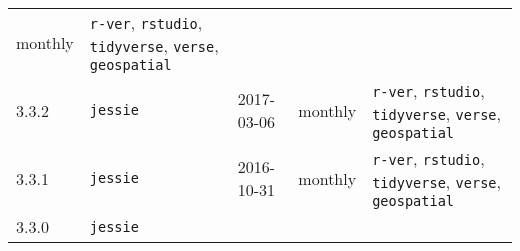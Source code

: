 \begin{longtable}[]{@{}lllll@{}}
\begin{minipage}[t]{0.19\columnwidth}
monthly\strut
\end{minipage} & \begin{minipage}[t]{0.32\columnwidth}\raggedright\strut
\texttt{r-ver}, \texttt{rstudio}, \texttt{tidyverse}, \texttt{verse},
\texttt{geospatial}\strut
\end{minipage}\tabularnewline
\begin{minipage}[t]{0.09\columnwidth}\raggedright\strut
3.3.2\strut
\end{minipage} & \begin{minipage}[t]{0.12\columnwidth}\raggedright\strut
\texttt{jessie}\strut
\end{minipage} & \begin{minipage}[t]{0.15\columnwidth}\raggedright\strut
2017-03-06\strut
\end{minipage} & \begin{minipage}[t]{0.19\columnwidth}\raggedright\strut
monthly\strut
\end{minipage} & \begin{minipage}[t]{0.32\columnwidth}\raggedright\strut
\texttt{r-ver}, \texttt{rstudio}, \texttt{tidyverse}, \texttt{verse},
\texttt{geospatial}\strut
\end{minipage}\tabularnewline
\begin{minipage}[t]{0.09\columnwidth}\raggedright\strut
3.3.1\strut
\end{minipage} & \begin{minipage}[t]{0.12\columnwidth}\raggedright\strut
\texttt{jessie}\strut
\end{minipage} & \begin{minipage}[t]{0.15\columnwidth}\raggedright\strut
2016-10-31\strut
\end{minipage} & \begin{minipage}[t]{0.19\columnwidth}\raggedright\strut
monthly\strut
\end{minipage} & \begin{minipage}[t]{0.32\columnwidth}\raggedright\strut
\texttt{r-ver}, \texttt{rstudio}, \texttt{tidyverse}, \texttt{verse},
\texttt{geospatial}\strut
\end{minipage}\tabularnewline
\begin{minipage}[t]{0.09\columnwidth}\raggedright\strut
3.3.0\strut
\end{minipage} & \begin{minipage}[t]{0.12\columnwidth}\raggedright\strut
\texttt{jessie}\strut
\end{minipage} & \begin{minipage}[t]{0.15\columnwidth}\raggedright\strut

\end{minipage}
\end{longtable}
